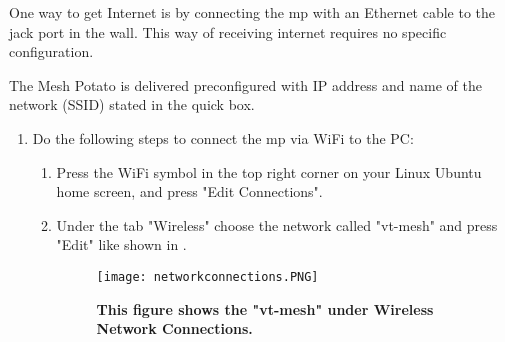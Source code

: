 
One way to get Internet is by connecting the \gls{mp} with an Ethernet cable to the jack port in the wall. This way of receiving internet requires no specific configuration. 

The Mesh Potato is delivered preconfigured with IP address and name of the network (SSID) stated in the \gls{quick} box.


\begin{enumerate}
\item Do the following steps to connect the \gls{mp} via WiFi to the PC:
\begin{enumerate}
\item Press the WiFi symbol in the top right corner on your Linux Ubuntu home screen, and press "Edit Connections".
\item  Under the tab "Wireless" choose the network called "vt-mesh" and press "Edit" like shown in .
\begin{figure}[h!]
  \centering
      \texttt{[image: networkconnections.PNG]}
  \caption [Network Connections on Linux Ubuntu]{\textbf{This figure shows the "vt-mesh" under Wireless Network Connections.}}
  \label{fig:networkconnections}
\end{figure}


\end{enumerate}
\end{enumerate}
